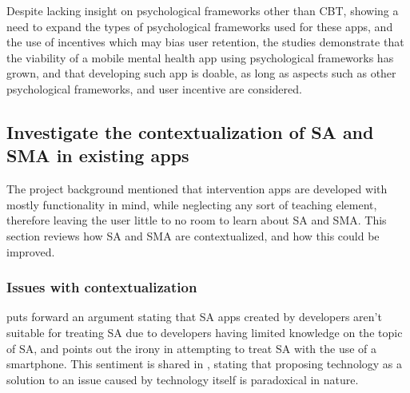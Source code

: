 \documentclass[12pt]{article}
\begin{document}
Despite lacking insight on psychological frameworks other than CBT,
showing a need to expand the types of psychological frameworks used for these apps, and the use of incentives 
which may bias user retention, the studies demonstrate that the viability of a mobile mental health app
using psychological frameworks has grown, and that developing such app is doable, as long
as aspects such as other psychological frameworks, and user incentive are considered. 




\subsection{Investigate the contextualization of SA and SMA in existing apps}
The project background mentioned that intervention apps are developed with
mostly functionality in mind, while neglecting any sort of teaching element, therefore leaving the user little to 
no room to learn about SA and SMA. This section reviews how SA and SMA are contextualized, and
how this could be improved.


\subsubsection{Issues with contextualization}
\textcite{RefWorks:RefID:35-dosselaar2017smartphone} puts forward an argument stating that 
SA apps created by developers aren't suitable for treating SA due to developers having limited knowledge on the
topic of SA, and points out the irony in attempting to treat SA with the use of a smartphone. This sentiment is 
shared in \textcite{RefWorks:RefID:126-petrucco2021user}, stating that proposing technology as a solution to 
an issue caused by technology itself is paradoxical in nature. \newline

\end{document}
